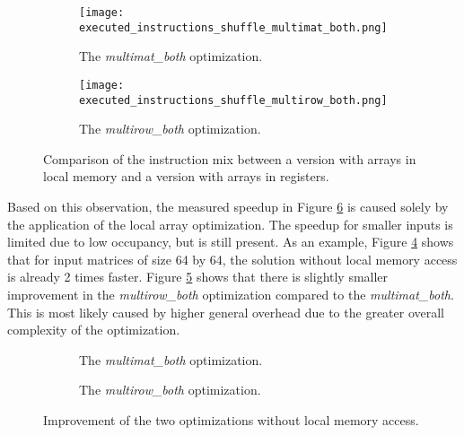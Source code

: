 \begin{figure}[ht]
	\centering	
	\begin{subfigure}{\textwidth}
		\centering
		\texttt{[image: executed\_instructions\_shuffle\_multimat\_both.png]}
		\caption{The \textit{multimat\_both} optimization.}
		\label{fig:shuffle_multimat_both_instruction_mix}
	\end{subfigure}
	\hfill
	\begin{subfigure}{\textwidth}
		\centering
		\texttt{[image: executed\_instructions\_shuffle\_multirow\_both.png]}
		\caption{The \textit{multirow\_both} optimization.}
		\label{fig:shuffle_multirow_both_instruction_mix}
	\end{subfigure}
	
	\caption{Comparison of the instruction mix between a version with arrays in local memory and a version with arrays in registers.}
	\label{fig:instruction_mix_local_mem}
\end{figure}

Based on this observation, the measured speedup in Figure \ref{fig:speedup_local_mem} is caused solely by the application of the local array optimization. The speedup for smaller inputs is limited due to low occupancy, but is still present. As an example, Figure \ref{fig:multimat_both_speedup} shows that for input matrices of size 64 by 64, the solution without local memory access is already 2 times faster. Figure \ref{fig:multirow_both_speedup} shows that there is slightly smaller improvement in the \textit{multirow\_both} optimization compared to the \textit{multimat\_both}. This is most likely caused by higher general overhead due to the greater overall complexity of the optimization.


\begin{figure}[ht]
	\centering	
	\begin{subfigure}{0.45\textwidth}
		\centering
		\def\svgwidth{\textwidth}
		
		\caption{The \textit{multimat\_both} optimization.}
		\label{fig:multimat_both_speedup}
	\end{subfigure}
	\hfill
	\begin{subfigure}{0.45\textwidth}
		\centering
		\def\svgwidth{\textwidth}
		
		\caption{The \textit{multirow\_both} optimization.}
		\label{fig:multirow_both_speedup}
	\end{subfigure}
	
	\caption{Improvement of the two optimizations without local memory access.}
	\label{fig:speedup_local_mem}
\end{figure}


